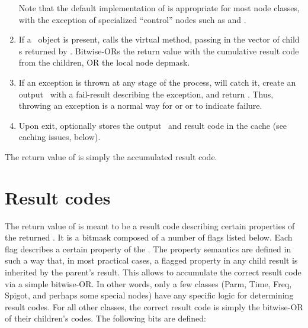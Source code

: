\begin{enumerate}
    Note that the default implementation of  is appropriate
    for most node classes, with the exception of specialized ``control'' nodes
    such as  and .

  \item If a \Cells\ object is present, calls the virtual 
    method, passing in the vector of child \Result{}s returned by
    . Bitwise-ORs the return value with the cumulative
    result code from the children, OR the local node depmask.

  \item If an exception is thrown at any stage of the process, 
    will catch it, create an output \Result\ with a fail-result describing the
    exception, and return . Thus, throwing an exception is a normal
    way for  or  or  to
    indicate failure.

  \item Upon exit, optionally stores the output \Result\ and result code in the
    cache (see caching issues, below).

  \end{enumerate}

  The return value of  is simply the accumulated result code.
  
\section{Result codes}

  The return value of  is meant to be a result code describing
  certain properties  of the returned \Result. It is a bitmask composed of a
  number of flags listed below. Each flag describes a certain property of the
  \Result. The property semantics are defined in such a way that, in most
  practical cases, a flagged property in any child result is inherited by the
  parent's result. This allows  to accumulate the correct result
  code via a simple bitwise-OR. In other words, only a few classes (Parm, Time,
  Freq, Spigot, and perhaps some special nodes) have any specific logic for
  determining result codes. For all other classes, the correct result code is
  simply the bitwise-OR of their children's codes. The following bits are
  defined:
  
